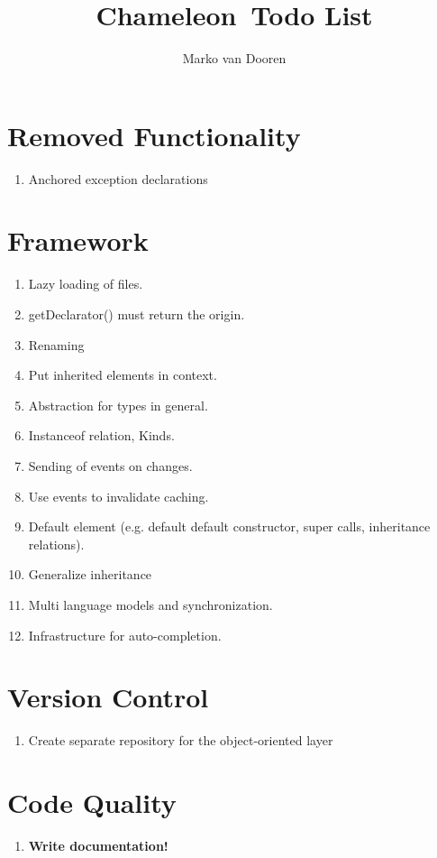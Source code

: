 \documentclass{article}
\begin{document}
\newcommand{\cham}{Chameleon}
\newcommand{\code}[1]{\texttt{#1}}

\title{\cham\ Todo List}
\author{Marko van Dooren}
\maketitle

\section{Removed Functionality}
\begin{enumerate}
\item Anchored exception declarations
\end{enumerate}

\section{Framework}
\begin{enumerate}
\item Lazy loading of files.
\item getDeclarator() must return the origin.
\item Renaming
\item Put inherited elements in context.
\item Abstraction for types in general.
\item Instanceof relation, Kinds.
\item Sending of events on changes.
\item Use events to invalidate caching.
\item Default element (e.g. default default constructor, super calls,
  inheritance relations).
\item Generalize inheritance
\item Multi language models and synchronization.
\item Infrastructure for auto-completion.
\end{enumerate}

\section{Version Control}
\begin{enumerate}
\item Create separate repository for the object-oriented layer
\end{enumerate}

\section{Code Quality}
\begin{enumerate}
\item \textbf{Write documentation!}
\end{enumerate}
\end{document}
